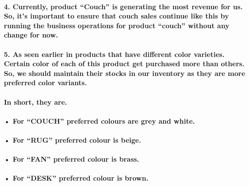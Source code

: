 \documentclass[
]{article}
\begin{document}
\hypertarget{currently-product-couch-is-generating-the-most-revenue-for-us.-so-its-important-to-ensure-that-couch-sales-continue-like-this-by-running-the-business-operations-for-product-couch-without-any-change-for-now.}{%
\paragraph{4. Currently, product ``Couch'' is generating the most
revenue for us. So, it's important to ensure that couch sales continue
like this by running the business operations for product ``couch''
without any change for
now.}\label{currently-product-couch-is-generating-the-most-revenue-for-us.-so-its-important-to-ensure-that-couch-sales-continue-like-this-by-running-the-business-operations-for-product-couch-without-any-change-for-now.}}

\hypertarget{as-seen-earlier-in-products-that-have-different-color-varieties.-certain-color-of-each-of-this-product-get-purchased-more-than-others.-so-we-should-maintain-their-stocks-in-our-inventory-as-they-are-more-preferred-color-variants.}{%
\paragraph{5. As seen earlier in products that have different color
varieties. Certain color of each of this product get purchased more than
others. So, we should maintain their stocks in our inventory as they are
more preferred color
variants.}\label{as-seen-earlier-in-products-that-have-different-color-varieties.-certain-color-of-each-of-this-product-get-purchased-more-than-others.-so-we-should-maintain-their-stocks-in-our-inventory-as-they-are-more-preferred-color-variants.}}

\hypertarget{in-short-they-are.}{%
\paragraph{In short, they are.}\label{in-short-they-are.}}

\hypertarget{for-couch-preferred-colours-are-grey-and-white.}{%
\paragraph{• For ``COUCH'' preferred colours are grey and
white.}\label{for-couch-preferred-colours-are-grey-and-white.}}

\hypertarget{for-rug-preferred-colour-is-beige.}{%
\paragraph{• For ``RUG'' preferred colour is
beige.}\label{for-rug-preferred-colour-is-beige.}}

\hypertarget{for-fan-preferred-colour-is-brass.}{%
\paragraph{• For ``FAN'' preferred colour is
brass.}\label{for-fan-preferred-colour-is-brass.}}

\hypertarget{for-desk-preferred-colour-is-brown.}{%
\paragraph{• For ``DESK'' preferred colour is
brown.}\label{for-desk-preferred-colour-is-brown.}}
\end{document}
